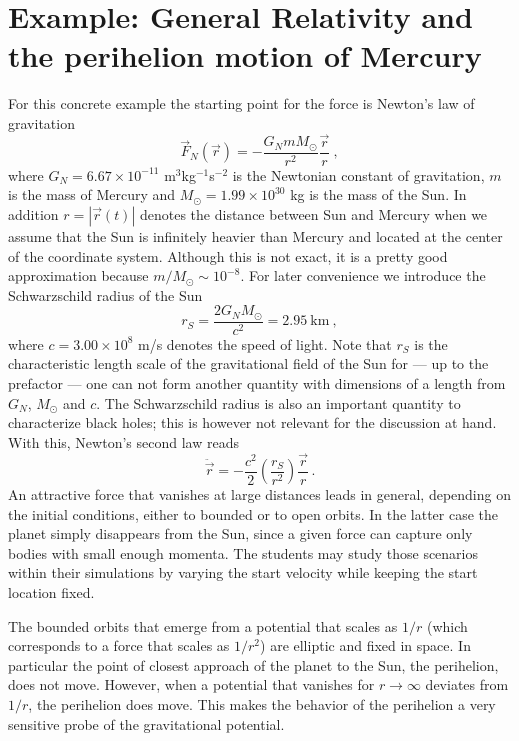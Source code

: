 \documentclass[12pt,ngerman,american]{iopart}
\begin{document}
\section{Example: General Relativity and the perihelion motion of Mercury}\label{sec:gr}
For this concrete example the starting point for the force is Newton's law of gravitation
\begin{equation}
\vec F_N(\vec r) = - \frac{G_N m M_\odot}{r^2} \frac{\vec r}{r}\ ,
\end{equation}
where $G_N=6.67\times 10^{-11}$ m$^3$kg$^{-1}$s$^{-2}$ is the Newtonian constant of gravitation, $m$ is the mass of Mercury and $M_\odot=1.99\times 10^{30}$ kg is the mass of the Sun.
In addition $r=|\vec r(t)|$ denotes the distance between Sun and Mercury when we assume that the Sun is infinitely heavier than Mercury and located at the center of the coordinate system.
Although this is not exact, it is a pretty good approximation because $m/M_\odot\sim 10^{-8}$.
For later convenience we introduce the Schwarzschild radius of the Sun
\begin{equation}
r_S=\frac{2G_N  M_\odot}{c^2} = 2.95 \ \mbox{km} \ , \label{rsdef}
\end{equation}
where $c=3.00\times 10^8$ m/s denotes the speed of light.
Note that $r_S$ is the characteristic length scale of the gravitational field of the Sun for --- up to the prefactor --- one can not form another quantity with dimensions of a length from $G_N$, $M_\odot$ and $c$.
The Schwarzschild radius is also an important quantity to characterize black holes; this is however not relevant for the discussion at hand.
With this, Newton's second law reads
\begin{equation}
\ddot{\vec r}      = - \frac{c^2}{2}\left(\frac{r_S}{r^2}\right)\frac{\vec r}{r} \, . \label{eq:newton}
\end{equation}
An attractive force that vanishes at large distances leads in general, depending on the initial conditions, either to bounded or to open orbits.
In the latter case the planet simply disappears from the Sun, since a given force can capture only bodies with small enough momenta.
The students may study those scenarios within their simulations by varying the start velocity while keeping the start location fixed.

The bounded orbits that emerge from a potential that scales as $1/r$ (which corresponds to a force that scales as $1/r^2$) are elliptic and fixed in space.
In particular the point of closest approach of the planet to the Sun, the perihelion, does not move.
However, when a potential that vanishes for $r\to \infty$ deviates from $1/r$, the perihelion does move.
This makes the behavior of the perihelion a very sensitive probe of the gravitational potential.
\end{document}
